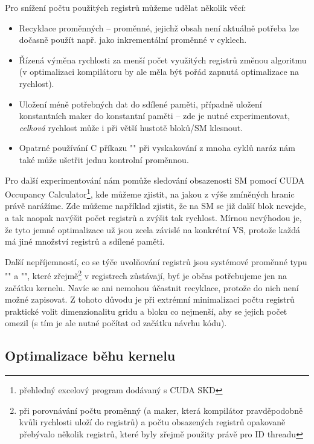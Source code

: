         Pro snížení počtu použitých registrů můžeme udělat několik věcí:
        \begin{itemize}
          \item Recyklace proměnných -- proměnné, jejichž obsah není aktuálně potřeba lze dočasně použít např. jako inkrementální proměnné v cyklech.
          \item Řízená výměna rychlosti za menší počet využitých registrů změnou algoritmu (v optimalizaci kompilátoru by ale měla být pořád zapnutá optimalizace na rychlost).
          \item Uložení méně potřebných dat do sdílené paměti, případně uložení konstantních maker do konstantní paměti -- zde je nutné experimentovat, \emph{celková} rychlost může i při větší hustotě bloků/SM klesnout.
          \item Opatrné používání C příkazu \Vr"" při vyskakování z mnoha cyklů naráz nám také může ušetřit jednu kontrolní proměnnou.
        \end{itemize}

        Pro další experimentování nám pomůže sledování obsazenosti SM pomocí CUDA Occupancy Calculator\footnote{přehledný excelový program dodávaný s CUDA SKD}, kde můžeme zjistit, na jakou z výše zmíněných hranic právě narážíme. Zde můžeme například zjistit, že na SM se již další blok nevejde, a tak naopak navýšit počet registrů a zvýšit tak rychlost. Mírnou nevýhodou je, že tyto jemné optimalizace už jsou zcela závislé na konkrétní VS, protože každá má jiné množství registrů a sdílené paměti.

        Další nepříjemností, co se týče uvolňování registrů jsou systémové proměnné typu \Vr"" a \Vr"", které zřejmě\footnote{při porovnávání počtu proměnný (a maker, která kompilátor pravděpodobně kvůli rychlosti uloží do registrů) a počtu obsazených registrů opakovaně přebývalo několik registrů, které byly zřejmě použity právě pro ID threadu} v registrech zůstávají, byť je občas potřebujeme jen na začátku kernelu. Navíc se ani nemohou účastnit recyklace, protože do nich není možné zapisovat. Z tohoto důvodu je při extrémní minimalizaci počtu registrů praktické volit dimenzionalitu gridu a bloku co nejmenší, aby se jejich počet omezil (s tím je ale nutné počítat od začátku návrhu kódu).

    \subsection{Optimalizace běhu kernelu}

